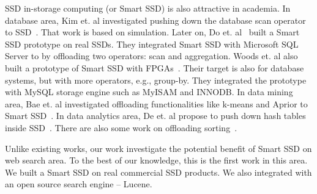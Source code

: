 SSD in-storage computing (or Smart SSD) is also attractive in academia. In database area, Kim et. al investigated pushing down the database scan operator to SSD~\cite{KimOPCL11}.
That work is based on simulation. Later on, Do et. al~\cite{Do2013QPS} built a Smart SSD prototype on real SSDs. They integrated Smart SSD with Microsoft SQL Server to by offloading two operators: scan and aggregation. Woods et. al also built a prototype of Smart SSD with FPGAs~\cite{WoodsIA14}. Their target is also for database systems, but with more operators, e.g., group-by. They integrated the prototype with MySQL storage engine such as MyISAM and INNODB. In data mining area, Bae et. al investigated offloading functionalities like k-means and Aprior to Smart SSD~\cite{BaeKKOP13}. In data analytics area, De et. al propose to push down hash tables inside SSD~\cite{De2013}. There are also some work on offloading sorting~\cite{Young14}.

Unlike existing works, our work investigate the potential benefit of Smart SSD on web search area. To the best of our knowledge, this is the first work in this area. We built a Smart SSD on real commercial SSD products. We also integrated with an open source search engine -- Lucene.
